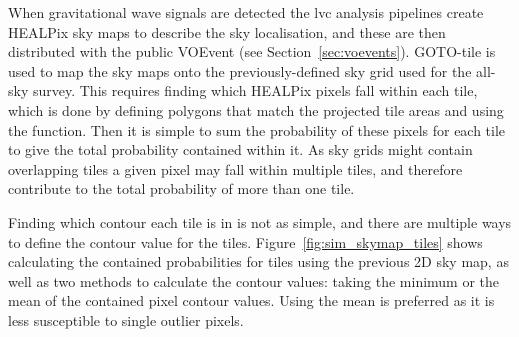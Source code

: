 \begin{colsection}
\begin{colsection}
When gravitational wave signals are detected the \gls{lvc} analysis pipelines create HEALPix sky maps to describe the sky localisation, and these are then distributed with the public VOEvent (see Section~\ref{sec:voevents}). GOTO-tile is used to map the sky maps onto the previously-defined sky grid used for the all-sky survey. This requires finding which HEALPix pixels fall within each tile, which is done by defining polygons that match the projected tile areas and using the   function. Then it is simple to sum the probability of these pixels for each tile to give the total probability contained within it. As sky grids might contain overlapping tiles a given pixel may fall within multiple tiles, and therefore contribute to the total probability of more than one tile.

Finding which contour each tile is in is not as simple, and there are multiple ways to define the contour value for the tiles. Figure~\ref{fig:sim_skymap_tiles} shows calculating the contained probabilities for tiles using the previous 2D sky map, as well as two methods to calculate the contour values: taking the minimum or the mean of the contained pixel contour values. Using the mean is preferred as it is less susceptible to single outlier pixels.


\begin{figure}[p]


\end{figure}
\end{colsection}
\end{colsection}
